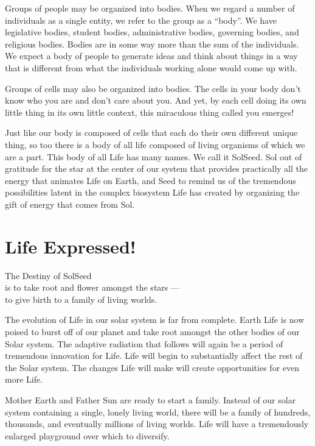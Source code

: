 \documentclass[ebook,12pt,openany,twoside]{memoir}
\newcommand{\tab}{\hspace*{2em}}
\newcommand{\imagefacingchapter}[1]{
  \cleartoverso
  \clearpage \null
  \thispagestyle{cleared}
  \AddToShipoutPictureBG*{%
    \AtStockLowerLeft{%
      \texttt{[image: \#1]}
    }
  }
  \clearpage
}
\begin{document}
\noindent Groups of people may be organized into bodies. When we regard a
number of individuals as a single entity, we refer to the group as a ``body''.
We have legislative bodies, student bodies, administrative bodies, governing
bodies, and religious bodies. Bodies are in some way more than the sum of the
individuals. We expect a body of people to generate ideas and think about
things in a way that is different from what the individuals working alone would
come up with.

Groups of cells may also be organized into bodies.  The cells in your body don't
know who you are and don't care about you. And yet, by each cell doing its own
little thing in its own little context, this miraculous thing called
you emerges!

Just like our body is composed of cells that each do their own different unique
thing, so too there is a body of all life composed of living organisms of which
we are a part. This body of all Life has many names. We call it SolSeed. Sol
out of gratitude for the star at the center of our system that provides
practically all the energy that animates Life on Earth, and Seed to remind us
of the tremendous possibilities latent in the complex biosystem Life has
created by organizing the gift of energy that comes from Sol.






\imagefacingchapter{images/TakeRootAndFlower}
\chapter{Life Expressed!}

\setlength\epigraphwidth{3.2in}
\epigraph{
  The Destiny of SolSeed\\
  is to take root and flower amongst the stars ---\\
  \tab to give birth to a family of living worlds.
}{}

\noindent The evolution of Life in our solar system is far from complete. Earth
Life is now poised to burst off of our planet and take root amongst the other
bodies of our Solar system. The adaptive radiation that follows will again be a
period of tremendous innovation for Life. Life will begin to substantially
affect the rest of the Solar system. The changes Life will make will create
opportunities for even more Life.

Mother Earth and Father Sun are ready to start a family. Instead of our solar
system containing a single, lonely living world, there will be a family of
hundreds, thousands, and eventually millions of living worlds. Life will have a
tremendously enlarged playground over which to diversify.
\end{document}
